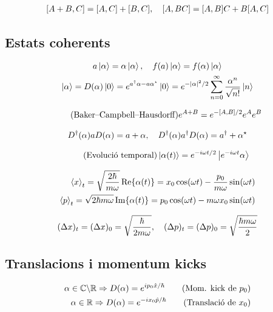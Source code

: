 \begin{align*}
	\qty[A+B,C] = \qty[A,C] + \qty[B,C] \qc \qty[A,BC] = \qty[A,B] C + B \qty[A,C]
\end{align*}

\subsection{Estats coherents}
\begin{align*}
\begin{gathered}
	a\ket{\alpha} = \alpha\ket{\alpha} \qc f(a)\ket{\alpha} = f(\alpha)\ket{\alpha} \\
	\ket{\alpha} = D(\alpha) \ket{0} = e^{a\sdag \alpha - a \alpha\sast} \ket{0} = e^{-\abs{\alpha}^{2}/2} \sum_{n=0}^{\infty} \frac{\alpha^{n}}{\sqrt{n!}} \ket{n}
\end{gathered}
\end{align*}

\begin{align}\tag{Baker--Campbell--Hausdorff}
	e^{A+B} = e^{-\qty[A,B]/2} e^{A} e^{B}
\end{align}

\begin{align*}
	D\sdag(\alpha) a D(\alpha) = a + \alpha \qc D\sdag(\alpha) a\sdag D(\alpha) = a\sdag + \alpha\sast
\end{align*}

\begin{align}\tag{Evolució temporal}
	\ket{\alpha (t)} = e^{-i\omega t/2}\ket{e^{-i\omega t} \alpha}
\end{align}

\begin{align*}
	\ev{x}_{t} = \sqrt{\frac{2\hbar}{m\omega}} \Re{\alpha(t)} = x_{0} \cos(\omega t) - \frac{p_{0}}{m\omega} \sin(\omega t) \\
	\ev{p}_{t} = \sqrt{2\hbar m\omega} \Im{\alpha(t)} = p_{0} \cos(\omega t) - m\omega x_{0} \sin(\omega t)
\end{align*}

\begin{align*}
	(\Delta x)_{t} = (\Delta x)_{0} = \sqrt{\frac{\hbar}{2m\omega}} \qc (\Delta p)_{t} = (\Delta p)_{0} = \sqrt{\frac{\hbar m\omega}{2}}
\end{align*}

\subsection{Translacions i momentum kicks}
\begin{align}
	\alpha \in \mbb{C}\backslash\mbb{R} \Rightarrow D(\alpha) = e^{ip_{0}\hat{x}/\hbar} \tag{Mom. kick de $p_{0}$} \\
	\alpha \in \mbb{R} \Rightarrow D(\alpha) = e^{-ix_{0}\hat{p}/\hbar} \tag{Translació de $x_{0}$}
\end{align}

